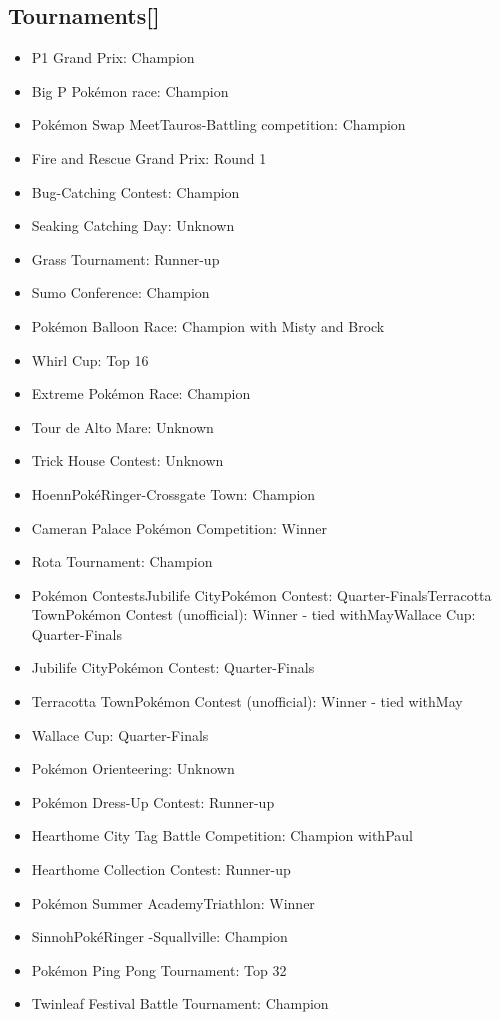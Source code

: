 \documentclass[a4paper,12pt]{article}
\begin{document}
\subsection*{Tournaments[]}\n\n\begin{itemize}
\item P1 Grand Prix: Champion
\item Big P Pokémon race: Champion
\item Pokémon Swap MeetTauros-Battling competition: Champion
\item Fire and Rescue Grand Prix: Round 1
\item Bug-Catching Contest: Champion
\item Seaking Catching Day: Unknown
\item Grass Tournament: Runner-up
\item Sumo Conference: Champion
\item Pokémon Balloon Race: Champion with Misty and Brock
\item Whirl Cup: Top 16
\item Extreme Pokémon Race: Champion
\item Tour de Alto Mare: Unknown
\item Trick House Contest: Unknown
\item HoennPokéRinger-Crossgate Town: Champion
\item Cameran Palace Pokémon Competition: Winner
\item Rota Tournament: Champion
\item Pokémon ContestsJubilife CityPokémon Contest: Quarter-FinalsTerracotta TownPokémon Contest (unofficial): Winner - tied withMayWallace Cup: Quarter-Finals
\item Jubilife CityPokémon Contest: Quarter-Finals
\item Terracotta TownPokémon Contest (unofficial): Winner - tied withMay
\item Wallace Cup: Quarter-Finals
\item Pokémon Orienteering: Unknown
\item Pokémon Dress-Up Contest: Runner-up
\item Hearthome City Tag Battle Competition: Champion withPaul
\item Hearthome Collection Contest: Runner-up
\item Pokémon Summer AcademyTriathlon: Winner
\item SinnohPokéRinger -Squallville: Champion
\item Pokémon Ping Pong Tournament: Top 32
\item Twinleaf Festival Battle Tournament: Champion

\end{itemize}
\end{document}
